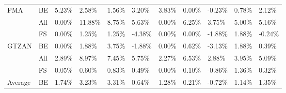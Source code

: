 \begin{table}[H]
{\begin{tabular}{lllllllllll}
    \multirow{-3}{*}{FMA}     & \multicolumn{1}{l|}{\cellcolor[HTML]{EFEFEF}BE}  & \cellcolor[HTML]{EFEFEF}5.23\% & \cellcolor[HTML]{EFEFEF}2.58\% & \cellcolor[HTML]{EFEFEF}1.56\% & \cellcolor[HTML]{EFEFEF}3.20\%  & \cellcolor[HTML]{EFEFEF}3.83\% & \cellcolor[HTML]{EFEFEF}0.00\% & \cellcolor[HTML]{EFEFEF}-0.23\% & \cellcolor[HTML]{EFEFEF}0.78\% & \cellcolor[HTML]{EFEFEF}2.12\%  \\ \cline{1-2}
                              & \multicolumn{1}{l|}{All}                         & 0.00\%                         & 11.88\%                        & 8.75\%                         & 5.63\%                          & 0.00\%                         & 6.25\%                         & 3.75\%                          & 5.00\%                         & 5.16\%                          \\
                              & \multicolumn{1}{l|}{\cellcolor[HTML]{EFEFEF}FS}  & \cellcolor[HTML]{EFEFEF}0.00\% & \cellcolor[HTML]{EFEFEF}1.25\% & \cellcolor[HTML]{EFEFEF}1.25\% & \cellcolor[HTML]{EFEFEF}-4.38\% & \cellcolor[HTML]{EFEFEF}0.00\% & \cellcolor[HTML]{EFEFEF}0.00\% & \cellcolor[HTML]{EFEFEF}-1.88\% & \cellcolor[HTML]{EFEFEF}1.88\% & \cellcolor[HTML]{EFEFEF}-0.24\% \\
    \multirow{-3}{*}{GTZAN}   & \multicolumn{1}{l|}{BE}                          & 0.00\%                         & 1.88\%                         & 3.75\%                         & -1.88\%                         & 0.00\%                         & 0.62\%                         & -3.13\%                         & 1.88\%                         & 0.39\%                          \\ \cline{1-2}
                              & \multicolumn{1}{l|}{\cellcolor[HTML]{EFEFEF}All} & \cellcolor[HTML]{EFEFEF}2.89\% & \cellcolor[HTML]{EFEFEF}8.97\% & \cellcolor[HTML]{EFEFEF}7.45\% & \cellcolor[HTML]{EFEFEF}5.75\%  & \cellcolor[HTML]{EFEFEF}2.27\% & \cellcolor[HTML]{EFEFEF}6.53\% & \cellcolor[HTML]{EFEFEF}2.88\%  & \cellcolor[HTML]{EFEFEF}3.95\% & \cellcolor[HTML]{EFEFEF}5.09\%  \\
                              & \multicolumn{1}{l|}{FS}                          & 0.05\%                         & 0.60\%                         & 0.83\%                         & 0.49\%                          & 0.00\%                         & 0.10\%                         & -0.86\%                         & 1.36\%                         & 0.32\%                          \\
    \multirow{-3}{*}{Average} & \multicolumn{1}{l|}{\cellcolor[HTML]{EFEFEF}BE}  & \cellcolor[HTML]{EFEFEF}1.74\% & \cellcolor[HTML]{EFEFEF}3.23\% & \cellcolor[HTML]{EFEFEF}3.31\% & \cellcolor[HTML]{EFEFEF}0.64\%  & \cellcolor[HTML]{EFEFEF}1.28\% & \cellcolor[HTML]{EFEFEF}0.21\% & \cellcolor[HTML]{EFEFEF}-0.72\% & \cellcolor[HTML]{EFEFEF}1.14\% & \cellcolor[HTML]{EFEFEF}1.35\% 
    \end{tabular}}
\end{table}

